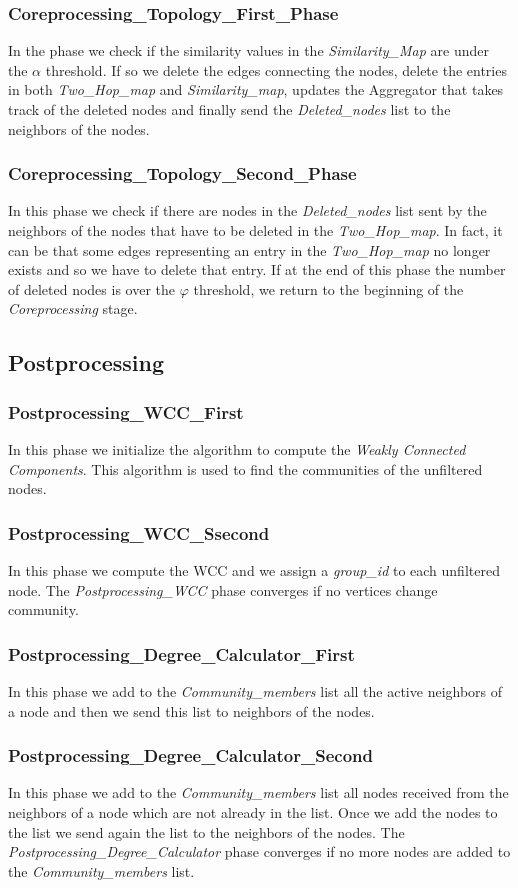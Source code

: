 \documentclass[12pt]{article}
\begin{document}
\subsubsection{Coreprocessing\_Topology\_First\_Phase}
In the phase we check if the similarity values in the \emph{Similarity\_Map} are under the $\alpha$ threshold. If so we delete the edges connecting the nodes, delete the entries in both \emph{Two\_Hop\_map} and \emph{Similarity\_map}, updates the Aggregator that takes track of the deleted nodes and finally send the \emph{Deleted\_nodes} list to the neighbors of the nodes.
\subsubsection{Coreprocessing\_Topology\_Second\_Phase}
In this phase we check if there are nodes in the \emph{Deleted\_nodes} list sent by the neighbors of the nodes that have to be deleted in the \emph{Two\_Hop\_map}. In fact, it can be that some edges representing an entry in the \emph{Two\_Hop\_map} no longer exists and so we have to delete that entry. If at the end of this phase the number of deleted nodes is over the $\varphi$ threshold, we return to the beginning of the \emph{Coreprocessing} stage.
\subsection{Postprocessing}
\subsubsection{Postprocessing\_WCC\_First}
In this phase we initialize the algorithm to compute the \emph{Weakly Connected Components}. This algorithm is used to find the communities of the unfiltered nodes.
\subsubsection{Postprocessing\_WCC\_Ssecond}
In this phase we compute the WCC and we assign a \emph{group\_id} to each unfiltered node. The \emph{Postprocessing\_WCC} phase converges if no vertices change community.
\subsubsection{Postprocessing\_Degree\_Calculator\_First}
In this phase we add to the \emph{Community\_members} list all the active neighbors of a node and then we send this list to neighbors of the nodes.
\subsubsection{Postprocessing\_Degree\_Calculator\_Second}
In this phase we add to the \emph{Community\_members} list all nodes received from the neighbors of a node which are not already in the list. Once we add the nodes to the list we send again the list to the neighbors of the nodes. The \emph{Postprocessing\_Degree\_Calculator} phase converges if no more nodes are added to the \emph{Community\_members} list.
\end{document}
